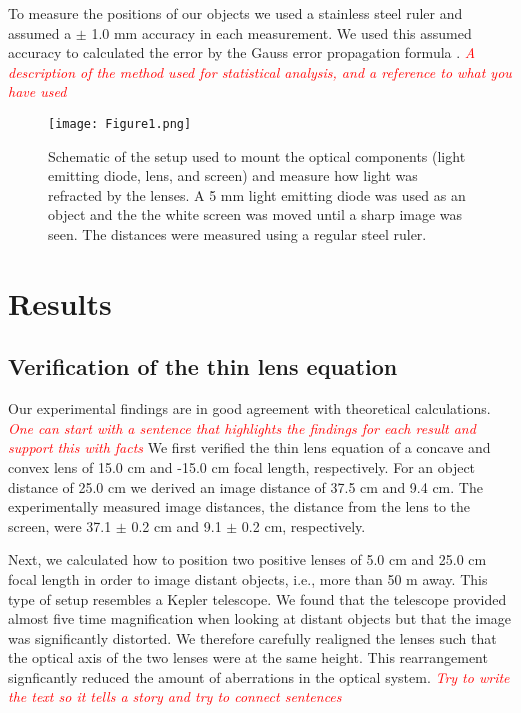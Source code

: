 \documentclass[fleqn,10pt]{SelfArx} %
\begin{document}
To measure the positions of our objects we used a stainless steel ruler and assumed a $\pm$ 1.0 mm accuracy in each measurement. We used this assumed accuracy to calculated the error by the Gauss error propagation formula \cite{Davis:ChemWiki}. \textcolor{red}{\textit{A description of the method used for statistical analysis, and a reference to what you have used}}

\begin{figure}[H]
    \centering
    \texttt{[image: Figure1.png]}
    \caption{Schematic of the setup used to mount the optical components (light emitting diode, lens, and screen) and measure how light was refracted by the lenses. A 5 mm light emitting diode was used as an object and the the white screen was moved until a sharp image was seen. The distances were measured using a regular steel ruler.}
    \label{fig:Setup}
\end{figure}

\section{Results}
\noindent
\subsection{Verification of the thin lens equation}
Our experimental findings are in good agreement with theoretical calculations. \textcolor{red}{\textit{One can start with a sentence that highlights the findings for each result and support this with facts}} We first verified the thin lens equation of a concave and convex lens of 15.0 cm and -15.0 cm focal length, respectively. For an object distance of 25.0 cm we derived an image distance of 37.5 cm and 9.4 cm. The experimentally measured image distances, the distance from the lens to the screen, were 37.1 $\pm$ 0.2 cm and 9.1 $\pm$ 0.2 cm, respectively.

Next, we calculated how to position two positive lenses of 5.0 cm and 25.0 cm focal length in order to image distant objects, i.e., more than 50 m away. This type of setup resembles a Kepler telescope. We found that the telescope provided almost five time magnification when looking at distant objects but that the image was significantly distorted. We therefore carefully realigned the lenses such that the optical axis of the two lenses were at the same height. This rearrangement signficantly reduced the amount of aberrations in the optical system. \textcolor{red}{\textit{Try to write the text so it tells a story and try to connect sentences}}
\end{document}
